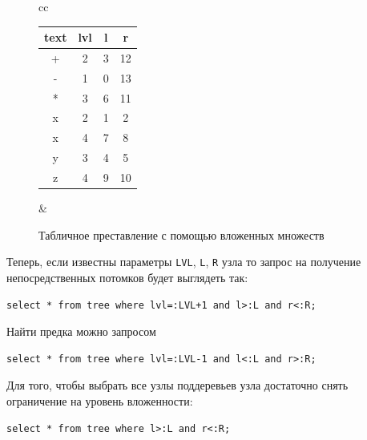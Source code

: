 \begin{figure}
    \centering
    \begin{tabular}{cc}
        \begin{tabular}{|c|c|c|c|}
            \hline\hline
            text&lvl    &l      &r \\
            \hline\hline
            +   &2      &3      &12 \\ \hline
            -   &1      &0      &13 \\ \hline
            *   &3      &6      &11 \\ \hline
            x   &2      &1      &2  \\ \hline
            x   &4      &7      &8  \\ \hline
            y   &3      &4      &5  \\ \hline
            z   &4      &9      &10 \\ \hline
        \end{tabular}
        &
    \end{tabular}
    \caption{Табличное преставление с помощью вложенных множеств}
    \label{fig:rec:treeRepNested}
\end{figure}

Теперь, если известны параметры \verb"LVL", \verb"L", \verb"R" узла то запрос на получение непосредственных потомков будет выглядеть так:
\begin{verbatim}
select * from tree where lvl=:LVL+1 and l>:L and r<:R;
\end{verbatim}

Найти предка можно запросом
\begin{verbatim}
select * from tree where lvl=:LVL-1 and l<:L and r>:R;
\end{verbatim}

Для того, чтобы выбрать все узлы поддеревьев узла достаточно снять ограничение на уровень вложенности:
\begin{verbatim}
select * from tree where l>:L and r<:R;
\end{verbatim}

